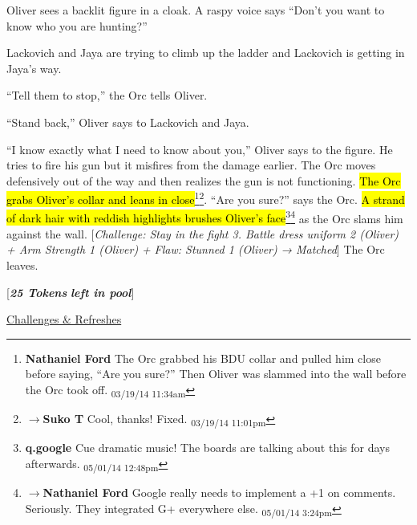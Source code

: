 Oliver sees a backlit figure in a cloak.  A raspy voice says ``Don't you want to know who you are hunting?''



Lackovich and Jaya are trying to climb up the ladder and Lackovich is getting in Jaya's way.  



``Tell them to stop,'' the Orc tells Oliver.

``Stand back,'' Oliver says to Lackovich and Jaya.



``I know exactly what I need to know about you,'' Oliver says to the figure.  He tries to fire his gun but it misfires from the damage earlier.   The Orc moves defensively out of the way and then realizes the gun is not functioning.  \hl{The Orc grabs Oliver's collar and leans in close}\footnote{\textbf{Nathaniel Ford }The Orc grabbed his BDU collar and pulled him close before saying, ``Are you sure?'' Then Oliver was slammed into the wall before the Orc took off. \textsubscript{03/19/14 11:34am}}\footnote{$\rightarrow$\textbf{Suko T }Cool, thanks!  Fixed. \textsubscript{03/19/14 11:01pm}}.  ``Are you sure?'' says the Orc.  \hl{A strand of dark hair with reddish highlights brushes Oliver's face}\footnote{\textbf{q.google }Cue dramatic music!  The boards are talking about this for days afterwards. \textsubscript{05/01/14 12:48pm}}\footnote{$\rightarrow$\textbf{Nathaniel Ford }Google really needs to implement a +1 on comments. Seriously. They integrated G+ everywhere else. \textsubscript{05/01/14 3:24pm}} as the Orc slams him against the wall.  {[}\textit{Challenge: Stay in the fight 3.  Battle dress uniform 2 (Oliver) + Arm Strength 1 (Oliver) + }\textit{ {\color[RGB]{255,0,0}Flaw: Stunned 1 (Oliver)} }\textit{ → Matched}{]}  The Orc leaves.





{[}\textit{\textbf{25 Tokens}}\textit{\textbf{ left in pool}}{]}





\underline{  {\LARGE Challenges \& Refreshes }  }



